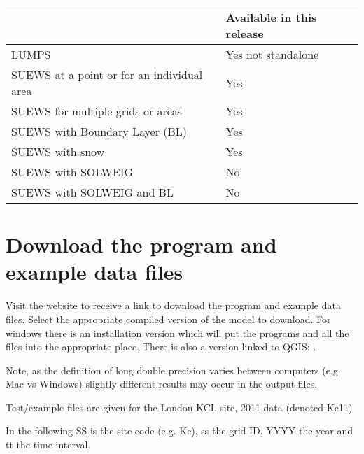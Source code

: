 \documentclass[letterpaper,10pt,english]{sphinxmanual}
\begin{document}
\begin{savenotes}\sphinxattablestart
\centering
\begin{tabulary}{\linewidth}[t]{|T|T|}
\hline
\sphinxstyletheadfamily &\sphinxstyletheadfamily 
Available in this release
\\
\hline
LUMPS
&
Yes \textendash{} not standalone
\\
\hline
SUEWS at a point or for an individual area
&
Yes
\\
\hline
SUEWS for multiple grids or areas
&
Yes
\\
\hline
SUEWS with Boundary Layer (BL)
&
Yes
\\
\hline
SUEWS with snow
&
Yes
\\
\hline
SUEWS with SOLWEIG
&
No
\\
\hline
SUEWS with SOLWEIG and BL
&
No
\\
\hline
\end{tabulary}
\par
\sphinxattableend\end{savenotes}


\section{Download the program and example data files}
\label{\detokenize{prepare-to-run-the-model:download-the-program-and-example-data-files}}
Visit the website to receive a link to download the program and example
data files. Select the appropriate compiled version of the model to
download. For windows there is an installation version which will put
the programs and all the files into the appropriate place. There is also
a version linked to QGIS:
.

Note, as the definition of long double precision varies between
computers (e.g. Mac vs Windows) slightly different results may occur in
the output files.

Test/example files are given for the London KCL site, 2011 data (denoted
Kc11)

In the following SS is the site code (e.g. Kc), ss the grid ID, YYYY the
year and tt the time interval.
\end{document}
